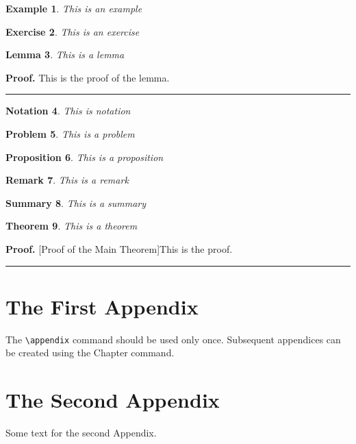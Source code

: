 \documentclass[a4paper]{book}%
\newtheorem{theorem}{Theorem}
\newtheorem{example}[theorem]{Example}
\newtheorem{exercise}[theorem]{Exercise}
\newtheorem{lemma}[theorem]{Lemma}
\newtheorem{notation}[theorem]{Notation}
\newtheorem{problem}[theorem]{Problem}
\newtheorem{proposition}[theorem]{Proposition}
\newtheorem{remark}[theorem]{Remark}
\newtheorem{summary}[theorem]{Summary}
\newenvironment{proof}[1][Proof]{\textbf{#1.} }{\ \rule{0.5em}{0.5em}}
\begin{document}
\begin{example}
This is an example
\end{example}

\begin{exercise}
This is an exercise
\end{exercise}

\begin{lemma}
This is a lemma
\end{lemma}

\begin{proof}
This is the proof of the lemma.
\end{proof}

\begin{notation}
This is notation
\end{notation}

\begin{problem}
This is a problem
\end{problem}

\begin{proposition}
This is a proposition
\end{proposition}

\begin{remark}
This is a remark
\end{remark}

\begin{summary}
This is a summary
\end{summary}

\begin{theorem}
This is a theorem
\end{theorem}

\begin{proof}
[Proof of the Main Theorem]This is the proof.
\end{proof}

\appendix

\chapter{The First Appendix}

The \verb"\appendix" command should be used only once. Subsequent appendices can
be created using the Chapter command.

\chapter{The Second Appendix}

Some text for the second Appendix.
\end{document}
